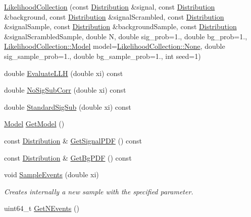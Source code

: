 \begin{DoxyCompactItemize}
\item 
\hyperlink{classLikelihoodCollection_acde8a81497f959a7b6af883490da0bd7}{Likelihood\-Collection} (const \hyperlink{classDistribution}{Distribution} \&signal, const \hyperlink{classDistribution}{Distribution} \&background, const \hyperlink{classDistribution}{Distribution} \&signal\-Scrambled, const \hyperlink{classDistribution}{Distribution} \&signal\-Sample, const \hyperlink{classDistribution}{Distribution} \&background\-Sample, const \hyperlink{classDistribution}{Distribution} \&signal\-Scrambled\-Sample, double N, double sig\-\_\-prob=1., double bg\-\_\-prob=1., \hyperlink{classLikelihoodCollection_a3d71df2ed0bdff414ae5fedb30f7cc76}{Likelihood\-Collection\-::\-Model} model=\hyperlink{classLikelihoodCollection_a3d71df2ed0bdff414ae5fedb30f7cc76a1f3fa362dbbf13c3fa8c732c6125b040}{Likelihood\-Collection\-::\-None}, double sig\-\_\-sample\-\_\-prob=1., double bg\-\_\-sample\-\_\-prob=1., int seed=1)
\item 
double \hyperlink{classLikelihoodCollection_a942b79738d2be74a358e138ff5284f53}{Evaluate\-L\-L\-H} (double xi) const 
\item 
double \hyperlink{classLikelihoodCollection_a72f0fc31317f33ad79cba87753ce736e}{No\-Sig\-Sub\-Corr} (double xi) const 
\item 
double \hyperlink{classLikelihoodCollection_a18f2600065b936215bea7c4eb223b548}{Standard\-Sig\-Sub} (double xi) const 
\item 
\hyperlink{classLikelihoodCollection_a3d71df2ed0bdff414ae5fedb30f7cc76}{Model} \hyperlink{classLikelihoodCollection_ad59da7f036985775d8c81caeaa8e461b}{Get\-Model} ()
\item 
const \hyperlink{classDistribution}{Distribution} \& \hyperlink{classLikelihoodCollection_acd787cbdd7ca9dbdc09bb2ec1972e29d}{Get\-Signal\-P\-D\-F} () const 
\item 
const \hyperlink{classDistribution}{Distribution} \& \hyperlink{classLikelihoodCollection_a1421a10716bb315e62c14ae325ed8311}{Get\-Bg\-P\-D\-F} () const 
\item 
void \hyperlink{classLikelihoodCollection_a38af4d60e248c8d32d0b05ce623c031b}{Sample\-Events} (double xi)
\begin{DoxyCompactList}\small\item\em Creates internally a new sample with the specified parameter. \end{DoxyCompactList}\item 
uint64\-\_\-t \hyperlink{classLikelihoodCollection_ad6a6c6a4549d33052f1a0256c1bee059}{Get\-N\-Events} ()

\end{DoxyCompactItemize}
